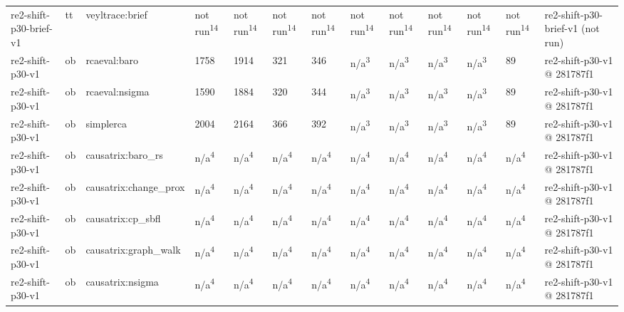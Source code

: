 \begin{table}[t]
\begin{tabular}{lllllllllllll}
re2-shift-p30-brief-v1 & tt & veyltrace:brief & not run\textsuperscript{14} & not run\textsuperscript{14} & not run\textsuperscript{14} & not run\textsuperscript{14} & not run\textsuperscript{14} & not run\textsuperscript{14} & not run\textsuperscript{14} & not run\textsuperscript{14} & not run\textsuperscript{14} & re2-shift-p30-brief-v1 (not run) \\
re2-shift-p30-v1 & ob & rcaeval:baro & 1758 & 1914 & 321 & 346 & n/a\textsuperscript{3} & n/a\textsuperscript{3} & n/a\textsuperscript{3} & n/a\textsuperscript{3} & 89 & re2-shift-p30-v1 @ 281787f1 \\
re2-shift-p30-v1 & ob & rcaeval:nsigma & 1590 & 1884 & 320 & 344 & n/a\textsuperscript{3} & n/a\textsuperscript{3} & n/a\textsuperscript{3} & n/a\textsuperscript{3} & 89 & re2-shift-p30-v1 @ 281787f1 \\
re2-shift-p30-v1 & ob & simplerca & 2004 & 2164 & 366 & 392 & n/a\textsuperscript{3} & n/a\textsuperscript{3} & n/a\textsuperscript{3} & n/a\textsuperscript{3} & 89 & re2-shift-p30-v1 @ 281787f1 \\
re2-shift-p30-v1 & ob & causatrix:baro\_rs & n/a\textsuperscript{4} & n/a\textsuperscript{4} & n/a\textsuperscript{4} & n/a\textsuperscript{4} & n/a\textsuperscript{4} & n/a\textsuperscript{4} & n/a\textsuperscript{4} & n/a\textsuperscript{4} & n/a\textsuperscript{4} & re2-shift-p30-v1 @ 281787f1 \\
re2-shift-p30-v1 & ob & causatrix:change\_prox & n/a\textsuperscript{4} & n/a\textsuperscript{4} & n/a\textsuperscript{4} & n/a\textsuperscript{4} & n/a\textsuperscript{4} & n/a\textsuperscript{4} & n/a\textsuperscript{4} & n/a\textsuperscript{4} & n/a\textsuperscript{4} & re2-shift-p30-v1 @ 281787f1 \\
re2-shift-p30-v1 & ob & causatrix:cp\_sbfl & n/a\textsuperscript{4} & n/a\textsuperscript{4} & n/a\textsuperscript{4} & n/a\textsuperscript{4} & n/a\textsuperscript{4} & n/a\textsuperscript{4} & n/a\textsuperscript{4} & n/a\textsuperscript{4} & n/a\textsuperscript{4} & re2-shift-p30-v1 @ 281787f1 \\
re2-shift-p30-v1 & ob & causatrix:graph\_walk & n/a\textsuperscript{4} & n/a\textsuperscript{4} & n/a\textsuperscript{4} & n/a\textsuperscript{4} & n/a\textsuperscript{4} & n/a\textsuperscript{4} & n/a\textsuperscript{4} & n/a\textsuperscript{4} & n/a\textsuperscript{4} & re2-shift-p30-v1 @ 281787f1 \\
re2-shift-p30-v1 & ob & causatrix:nsigma & n/a\textsuperscript{4} & n/a\textsuperscript{4} & n/a\textsuperscript{4} & n/a\textsuperscript{4} & n/a\textsuperscript{4} & n/a\textsuperscript{4} & n/a\textsuperscript{4} & n/a\textsuperscript{4} & n/a\textsuperscript{4} & re2-shift-p30-v1 @ 281787f1 \\

\end{tabular}
\end{table}
